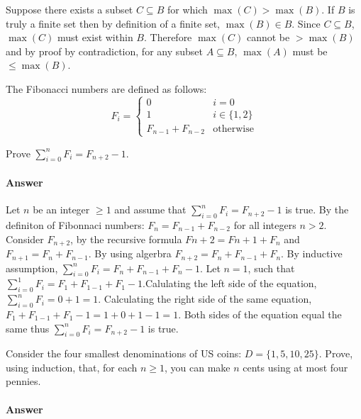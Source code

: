 \documentclass{article}
\begin{document}
Suppose there exists a subset $C \subseteq B$ for which $\max(C) > \max(B)$. If $B$ is truly a finite set then by definition of a finite set, $\max(B) \in B$. Since $C \subseteq B$, $\max(C)$ must exist within $B$. Therefore $\max(C)$ cannot be $> \max(B)$ and by proof by contradiction, for any subset $A \subseteq B$, $\max(A)$ must be $\leq \max(B)$.

\collab{\todo{}} 

The Fibonacci numbers are defined as follows:
$$
    F_i = \begin{cases}
		   0 & i=0\\
            1 & i \in \{1,2\} \\
            F_{n-1}+F_{n-2} & \text{otherwise}
          \end{cases}
$$

Prove $\sum_{i=0}^n F_i = F_{n+2}-1$.

\paragraph{Answer}

Let $n$ be an integer $\geq 1$ and assume that $\sum_{i=0}^n F_i = F_{n+2}-1$ is true. By the definiton of Fibonnaci numbers: $F_n =F_{n-1}+F_{n-2}$ for all integers $n>2$. Consider $F_{n+2}$, by the recursive formula $F{n+2}=F{n+1}+F_n$ and $F_{n+1} =F_n+F_{n-1}$. By using algerbra $F_{n+2}=F_n+F_{n-1}+F_n$. By inductive assumption, $\sum_{i=0}^n F_i = F_n+F_{n-1}+F_n-1$. Let $n=1$, such that $\sum_{i=0}^1 F_i = F_1+F_{1-1}+F_1-1$.Calulating the left side of the equation,  $\sum_{i=0}^n F_i =0+1=1$. Calculating the right side of the same equation,  $F_1+F_{1-1}+F_1-1= 1+0+1-1=1$. Both sides of the equation equal the same thus  $\sum_{i=0}^n F_i = F_{n+2}-1$ is true.

\collab{\todo{}} 

Consider the four smallest denominations of US coins: $D=\{1,5,10,25\}$.  Prove, using
induction, that, for each $n \geq 1$, you can make $n$ cents using at most four
pennies.

\paragraph{Answer}
\end{document}
